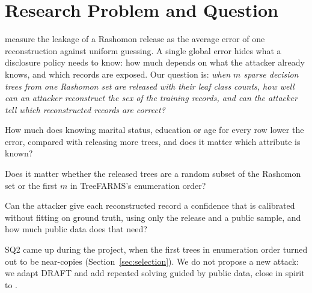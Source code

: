 \section{Research Problem and Question}

\citet{hsu2026rashomon} measure the leakage of a Rashomon release as the average error of one reconstruction against uniform guessing. A single global error hides what a disclosure policy needs to know: how much depends on what the attacker already knows, and which records are exposed. Our question is: \emph{when $m$ sparse decision trees from one Rashomon set are released with their leaf class counts, how well can an attacker reconstruct the sex of the training records, and can the attacker tell which reconstructed records are correct?}
\begin{description}[leftmargin=1.2em,itemsep=0pt,topsep=2pt]
  \item[SQ1.] How much does knowing marital status, education or age for every row lower the error, compared with releasing more trees, and does it matter which attribute is known?
  \item[SQ2.] Does it matter whether the released trees are a random subset of the Rashomon set or the first $m$ in TreeFARMS's enumeration order?
  \item[SQ3.] Can the attacker give each reconstructed record a confidence that is calibrated without fitting on ground truth, using only the release and a public sample, and how much public data does that need?
\end{description}
SQ2 came up during the project, when the first trees in enumeration order turned out to be near-copies (Section~\ref{sec:selection}). We do not propose a new attack: we adapt DRAFT and add repeated solving guided by public data, close in spirit to \citet{dick2023confidence}.
